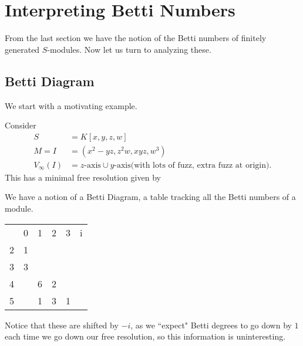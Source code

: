 
\newpage
\section{Interpreting Betti Numbers}

From the last section we have the notion of the Betti numbers of finitely generated $S$-modules. Now let us turn to analyzing these.

\subsection{Betti Diagram}

We start with a motivating example.

\begin{example}
    Consider
    \begin{align*}
        S &= K [ x,y,z,w]\\
        M = I &= (x^2 - yz , z^2 w , xyz, w^3)\\
        V_\infty (I) &= z\text{-axis} \cup y\text{-axis} \text{(with lots of fuzz, extra fuzz at origin)}.
    \end{align*}
    This has a minimal free resolution given by
    \begin{center}
    \end{center}

    We have a notion of a Betti Diagram, a table tracking all the Betti numbers of a module.

    \begin{center}
    \begin{tabular}{ c | c c c c c }
      & 0 & 1 & 2 & 3 & i\\
    \cline{1-5}
    2 & 1 &   &   &   &  \\
    3 & 3 &   &   &   &  \\
    4 &   & 6 & 2 &   &  \\
    5 &   & 1 & 3 & 1 &  \\
    \end{tabular}
    \end{center}
    Notice that these are shifted by $-i$, as we ``expect" Betti degrees to go down by $1$ each time we go down our free resolution, so this information is uninteresting.
\end{example}


